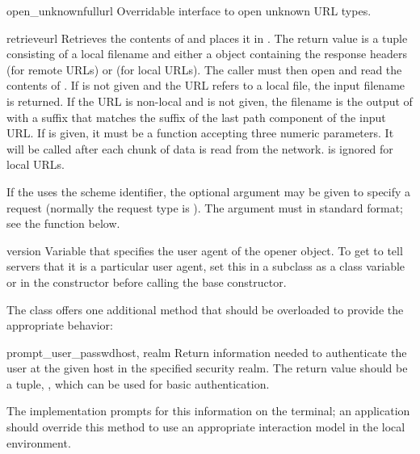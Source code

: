 \begin{methoddesc}[URLopener]{open_unknown}{fullurl}
Overridable interface to open unknown URL types.
\end{methoddesc}

\begin{methoddesc}[URLopener]{retrieve}{url}
Retrieves the contents of  and places it in .  The
return value is a tuple consisting of a local filename and either a
 object containing the response headers (for remote
URLs) or  (for local URLs).  The caller must then open and read the
contents of .  If  is not given and the URL
refers to a local file, the input filename is returned.  If the URL is
non-local and  is not given, the filename is the output of
 with a suffix that matches the suffix of the last
path component of the input URL.  If  is given, it must be
a function accepting three numeric parameters.  It will be called after each
chunk of data is read from the network.   is ignored for
local URLs.

If the  uses the  scheme identifier, the optional
 argument may be given to specify a  request
(normally the request type is ).  The  argument
must in standard  format;
see the  function below.
\end{methoddesc}

\begin{memberdesc}[URLopener]{version}
Variable that specifies the user agent of the opener object.  To get
 to tell servers that it is a particular user agent,
set this in a subclass as a class variable or in the constructor
before calling the base constructor.
\end{memberdesc}

The  class offers one additional method that
should be overloaded to provide the appropriate behavior:

\begin{methoddesc}[FancyURLopener]{prompt_user_passwd}{host, realm}
Return information needed to authenticate the user at the given host
in the specified security realm.  The return value should be a tuple,
, which can be used for basic
authentication.

The implementation prompts for this information on the terminal; an
application should override this method to use an appropriate
interaction model in the local environment.
\end{methoddesc}


